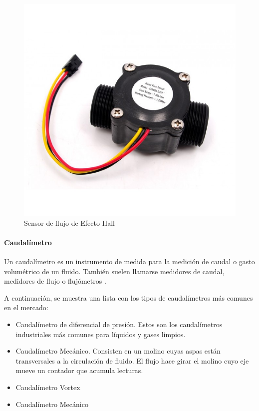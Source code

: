 \begin{figure}[H]
	\centering
	\includegraphics[scale=.4]{Capitulo2/images/flowmeter}
	\caption{Sensor de flujo de Efecto Hall}
	\label{fig:flowmeter}
\end{figure}

\paragraph{Caudalímetro}
Un caudalímetro es un instrumento de medida para la medición de caudal o gasto volumétrico de un fluido. También suelen llamarse medidores de caudal, medidores de flujo o flujómetros \citep{MarcoTeorico10}.

A continuación, se muestra una lista con los tipos de caudalímetros más comunes en el mercado:
\begin{itemize}
	\item Caudalímetro de diferencial de presión. Estos son los caudalímetros industriales más comunes para líquidos y gases limpios. \citep{MarcoTeorico10}
	\item Caudalímetro Mecánico. Consisten en un molino cuyas aspas están transversales a la circulación de fluido. El flujo hace girar el molino cuyo eje mueve un contador que acumula lecturas.
	\item Caudalímetro Vortex
	\item Caudalímetro Mecánico
\end{itemize} 
